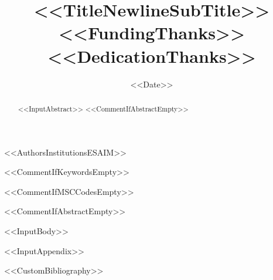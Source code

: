 \documentclass[<<DocumentClassOptions>>]{m2an}
\begin{document}
\title{<<TitleNewlineSubTitle>><<FundingThanks>><<DedicationThanks>>}

<<AuthorsInstitutionsESAIM>>

\date{<<Date>>}

<<CommentIfKeywordsEmpty>>

<<CommentIfMSCCodesEmpty>>

<<CommentIfAbstractEmpty>>\begin{abstract}
<<InputAbstract>>
<<CommentIfAbstractEmpty>>\end{abstract}

\maketitle

<<InputBody>>

\appendix
<<InputAppendix>>


<<CustomBibliography>>
\end{document}
